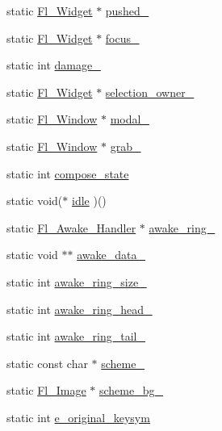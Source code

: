 \begin{DoxyCompactItemize}
\item 
static \hyperlink{class_fl___widget}{Fl\+\_\+\+Widget} $\ast$ \hyperlink{class_fl_a042d5a3835a4247a23e3923cfc43093c}{pushed\+\_\+}
\item 
static \hyperlink{class_fl___widget}{Fl\+\_\+\+Widget} $\ast$ \hyperlink{class_fl_ae09c11a79b524e3f759e1a777aebbf4c}{focus\+\_\+}
\item 
static int \hyperlink{class_fl_a8ef5178467ee84042b29dc170a5c5fa8}{damage\+\_\+}
\item 
static \hyperlink{class_fl___widget}{Fl\+\_\+\+Widget} $\ast$ \hyperlink{class_fl_a17de154975511e6a8dc1f6efd83f96ce}{selection\+\_\+owner\+\_\+}
\item 
static \hyperlink{class_fl___window}{Fl\+\_\+\+Window} $\ast$ \hyperlink{class_fl_ad309d170c817507e5c5f667832ea68fd}{modal\+\_\+}
\item 
static \hyperlink{class_fl___window}{Fl\+\_\+\+Window} $\ast$ \hyperlink{class_fl_aac8a6e2f3494c5f6aa2f964b550e7384}{grab\+\_\+}
\item 
static int \hyperlink{class_fl_aff0cbb8d7e80cdb8f91d7586e4dce71d}{compose\+\_\+state}
\item 
static void($\ast$ \hyperlink{class_fl_a7ffcc1f5d8fe8c2b77590f537be97ac6}{idle} )()
\item 
static \hyperlink{group__callback__functions_ga28b44ff2052ca0b06d0da852fadd42c0}{Fl\+\_\+\+Awake\+\_\+\+Handler} $\ast$ \hyperlink{class_fl_a19f90b17f909a9dde540ebcb09fd24df}{awake\+\_\+ring\+\_\+}
\item 
static void $\ast$$\ast$ \hyperlink{class_fl_a9eba043ab3fc37f2f808b298bc43b0bf}{awake\+\_\+data\+\_\+}
\item 
static int \hyperlink{class_fl_ae2172793d8bc327c298ef5d599250150}{awake\+\_\+ring\+\_\+size\+\_\+}
\item 
static int \hyperlink{class_fl_ae78bbc7027629eaf8baf6a8d54603979}{awake\+\_\+ring\+\_\+head\+\_\+}
\item 
static int \hyperlink{class_fl_a8006f96fdbca89835a28f495da8b3fef}{awake\+\_\+ring\+\_\+tail\+\_\+}
\item 
static const char $\ast$ \hyperlink{class_fl_a614ba7752b99edd34363040553569176}{scheme\+\_\+}
\item 
static \hyperlink{class_fl___image}{Fl\+\_\+\+Image} $\ast$ \hyperlink{class_fl_a4f625e8573ac7bb43b6d2304ce1751a5}{scheme\+\_\+bg\+\_\+}
\item 
static int \hyperlink{class_fl_a2bf425ec2398cff4531b2b8c879fc14e}{e\+\_\+original\+\_\+keysym}
\item 
$$
\end{DoxyCompactItemize}
